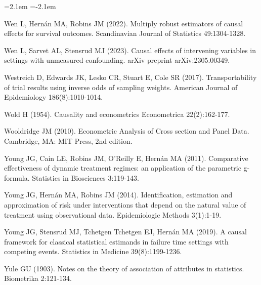 \begin{list}{}{\leftmargin=2.1em   \itemindent=-2.1em \parsep=0pt \itemsep=1.6pt \topsep=4pt \rightmargin=0pt}
\item Wen L, Hernán MA, Robins JM (2022). Multiply robust estimators of causal effects for survival outcomes. Scandinavian Journal of Statistics 49:1304-1328.
\item Wen L, Sarvet AL, Stensrud MJ (2023). Causal effects of intervening variables in settings with unmeasured confounding. arXiv preprint arXiv:2305.00349.
\item Westreich D, Edwards JK, Lesko CR, Stuart E, Cole SR (2017). Transportability of trial results using inverse odds of sampling weights. American Journal of Epidemiology 186(8):1010-1014.
\item Wold H (1954). Causality and econometrics Econometrica 22(2):162-177.
\item Wooldridge JM (2010). Econometric Analysis of Cross section and Panel Data. Cambridge, MA: MIT Press, 2nd edition.
\item Young JG, Cain LE, Robins JM, O'Reilly E, Hernán MA (2011). Comparative effectiveness of dynamic treatment regimes: an application of the parametric g-formula. Statistics in Biosciences 3:119-143.
\item Young JG, Hernán MA, Robins JM (2014). Identification, estimation and approximation of risk under interventions that depend on the natural value of treatment using observational data. Epidemiologic Methods 3(1):1-19.
\item Young JG, Stensrud MJ, Tchetgen Tchetgen EJ, Hernán MA (2019). A causal framework for classical statistical estimands in failure time settings with competing events. Statistics in Medicine 39(8):1199-1236.
\item Yule GU (1903). Notes on the theory of association of attributes in statistics. Biometrika 2:121-134.
\end{list}
\endgroup
